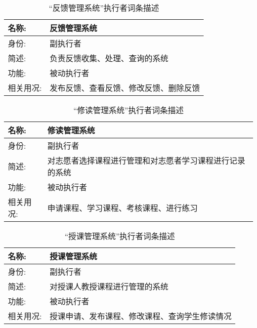 \begin{table}[H]  
\caption{“反馈管理系统”执行者词条描述}  
\begin{center}  
    \begin{tabular}{l p{11cm}} 
        \hline
        \quad 名称:  &  反馈管理系统 \\
        \hline
        \quad 身份:  & 副执行者 \\
        \hline
        \quad 简述:  & 负责反馈收集、处理、查询的系统 \\
        \hline
        \quad 功能:  & 被动执行者 \\
        \hline
        \quad 相关用况:  & 发布反馈、查看反馈、修改反馈、删除反馈 \\
        \hline
    \end{tabular}
\end{center}
\end{table}

\begin{table}[H]  
\caption{“修读管理系统”执行者词条描述}  
\begin{center}  
    \begin{tabular}{l p{11cm}} 
        \hline
        \quad 名称:  &  修读管理系统 \\
        \hline
        \quad 身份:  & 副执行者 \\
        \hline
        \quad 简述:  & 对志愿者选择课程进行管理和对志愿者学习课程进行记录的系统 \\
        \hline
        \quad 功能:  & 被动执行者 \\
        \hline
        \quad 相关用况:  & 申请课程、学习课程、考核课程、进行练习 \\
        \hline
    \end{tabular}
\end{center}
\end{table}


\begin{table}[H]  
\caption{“授课管理系统”执行者词条描述}  
\begin{center}  
    \begin{tabular}{l p{11cm}} 
        \hline
        \quad 名称:  &  授课管理系统 \\
        \hline
        \quad 身份:  & 副执行者 \\
        \hline
        \quad 简述:  & 对授课人教授课程进行管理的系统 \\
        \hline
        \quad 功能:  & 被动执行者 \\
        \hline
        \quad 相关用况:  & 授课申请、发布课程、修改课程、查询学生修读情况 \\
        \hline
    \end{tabular}
\end{center}
\end{table}